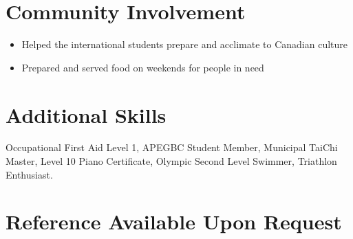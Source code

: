 \documentclass[11pt,a4paper,sans]{moderncv}        %
\begin{document}
\section{Community Involvement}
{}{
\begin{itemize}
  \item Helped the international students prepare and acclimate to Canadian culture
\end{itemize}
}
{}{
\begin{itemize}
  \item Prepared and served food on weekends for people in need
\end{itemize}
}


\section{Additional Skills}
Occupational First Aid Level 1, APEGBC Student Member, Municipal TaiChi Master, Level 10 Piano Certificate, Olympic Second Level Swimmer, Triathlon Enthusiast.

\section{Reference Available Upon Request}
\end{document}
